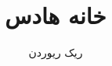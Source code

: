 \documentclass{book}
\author{ریک ریوردن}
\title{خانه هادس}
\date{}
\begin{document}
    \begin{titlepage}
        \maketitle
    \end{titlepage}
    
\end{document}
